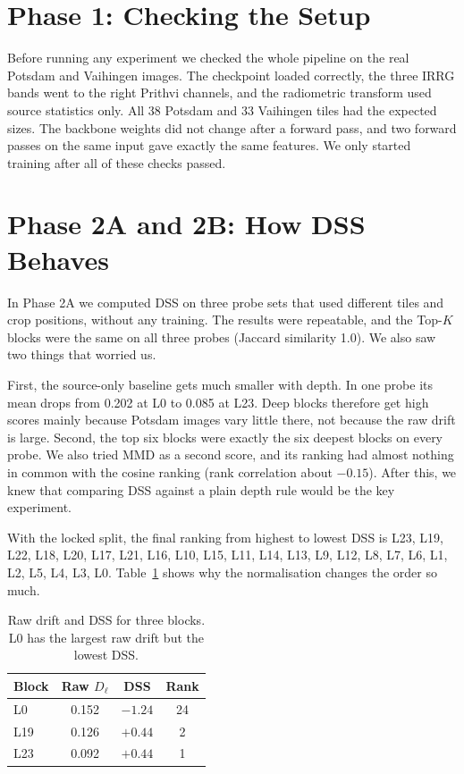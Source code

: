 \documentclass[11pt,a4paper]{report}
\begin{document}
\section{Phase 1: Checking the Setup}

Before running any experiment we checked the whole pipeline on the real Potsdam and Vaihingen images. The checkpoint loaded correctly, the three IRRG bands went to the right Prithvi channels, and the radiometric transform used source statistics only. All 38 Potsdam and 33 Vaihingen tiles had the expected sizes. The backbone weights did not change after a forward pass, and two forward passes on the same input gave exactly the same features. We only started training after all of these checks passed.

\section{Phase 2A and 2B: How DSS Behaves}
\label{sec:dssresults}

In Phase 2A we computed DSS on three probe sets that used different tiles and crop positions, without any training. The results were repeatable, and the Top-$K$ blocks were the same on all three probes (Jaccard similarity 1.0). We also saw two things that worried us.

First, the source-only baseline gets much smaller with depth. In one probe its mean drops from 0.202 at L0 to 0.085 at L23. Deep blocks therefore get high scores mainly because Potsdam images vary little there, not because the raw drift is large. Second, the top six blocks were exactly the six deepest blocks on every probe. We also tried MMD as a second score, and its ranking had almost nothing in common with the cosine ranking (rank correlation about $-0.15$). After this, we knew that comparing DSS against a plain depth rule would be the key experiment.

With the locked split, the final ranking from highest to lowest DSS is L23, L19, L22, L18, L20, L17, L21, L16, L10, L15, L11, L14, L13, L9, L12, L8, L7, L6, L1, L2, L5, L4, L3, L0. Table~\ref{tab:rawz} shows why the normalisation changes the order so much.

\begin{table}[t]
\centering
\caption{Raw drift and DSS for three blocks. L0 has the largest raw drift but the lowest DSS.}
\label{tab:rawz}
\small
\begin{tabular}{@{}lccc@{}}
\toprule
\textbf{Block} & \textbf{Raw $D_\ell$} & \textbf{DSS} & \textbf{Rank} \\
\midrule
L0  & 0.152 & $-1.24$ & 24 \\
L19 & 0.126 & $+0.44$ & 2 \\
L23 & 0.092 & $+0.44$ & 1 \\
\bottomrule
\end{tabular}
\end{table}
\end{document}
